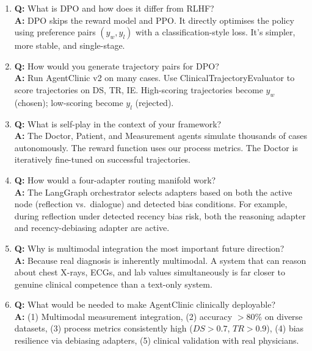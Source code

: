 \begin{vivabox}[\textcolor{white}{Likely Viva Questions}]
\begin{enumerate}
    \item \textbf{Q:} What is DPO and how does it differ from RLHF?\\
    \textbf{A:} DPO skips the reward model and PPO. It directly optimises the policy using preference pairs $(y_w, y_l)$ with a classification-style loss. It's simpler, more stable, and single-stage.

    \item \textbf{Q:} How would you generate trajectory pairs for DPO?\\
    \textbf{A:} Run AgentClinic v2 on many cases. Use ClinicalTrajectoryEvaluator to score trajectories on DS, TR, IE. High-scoring trajectories become $y_w$ (chosen); low-scoring become $y_l$ (rejected).

    \item \textbf{Q:} What is self-play in the context of your framework?\\
    \textbf{A:} The Doctor, Patient, and Measurement agents simulate thousands of cases autonomously. The reward function uses our process metrics. The Doctor is iteratively fine-tuned on successful trajectories.

    \item \textbf{Q:} How would a four-adapter routing manifold work?\\
    \textbf{A:} The LangGraph orchestrator selects adapters based on both the active node (reflection vs.\ dialogue) and detected bias conditions. For example, during reflection under detected recency bias risk, both the reasoning adapter and recency-debiasing adapter are active.

    \item \textbf{Q:} Why is multimodal integration the most important future direction?\\
    \textbf{A:} Because real diagnosis is inherently multimodal. A system that can reason about chest X-rays, ECGs, and lab values simultaneously is far closer to genuine clinical competence than a text-only system.

    \item \textbf{Q:} What would be needed to make AgentClinic clinically deployable?\\
    \textbf{A:} (1) Multimodal measurement integration, (2) accuracy $>$80\% on diverse datasets, (3) process metrics consistently high ($DS > 0.7$, $TR > 0.9$), (4) bias resilience via debiasing adapters, (5) clinical validation with real physicians.


\end{enumerate}
\end{vivabox}
